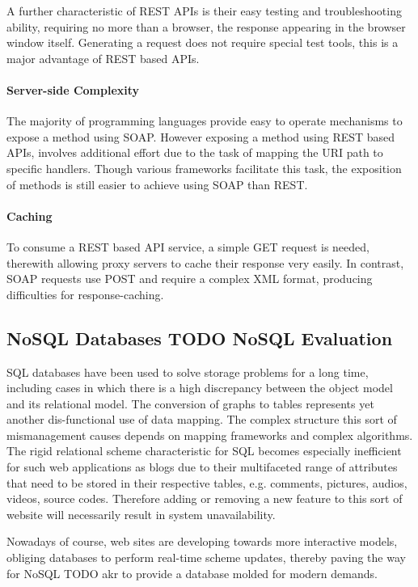 A further characteristic of REST APIs is their easy testing and troubleshooting ability, requiring no more than a browser, the response appearing in the browser window itself. Generating a request does not require special test tools, this is a major advantage of REST based APIs.  
  

\paragraph{Server-side Complexity}

The majority of programming languages provide easy to operate mechanisms to expose a method using SOAP. However exposing a method using REST based APIs, involves additional effort due to the task of mapping the URI path to specific handlers. Though various frameworks facilitate this task, the exposition of methods is still easier to achieve using SOAP than REST.

\paragraph{Caching}

To consume a REST based API service, a simple GET request is needed, therewith allowing proxy servers to cache their response very easily. In contrast, SOAP requests use POST and require a complex XML format, producing difficulties for response-caching.

\subsection{NoSQL Databases TODO NoSQL Evaluation\label{sec:back_da_per}}
SQL databases have been used to solve storage problems for a long time, including cases in which there is a high discrepancy between the object model and its relational model. The conversion of graphs to tables represents yet another dis-functional use of data mapping. The complex structure this sort of mismanagement causes depends on mapping frameworks and complex algorithms. The rigid relational scheme characteristic for SQL becomes especially inefficient for such web applications as blogs due to their multifaceted range of attributes that need to be stored in their respective tables, e.g. comments, pictures, audios, videos, source codes. Therefore adding or removing a new feature to this sort of website will necessarily result in system unavailability.          

Nowadays of course,  web sites are developing towards more interactive models, obliging databases to perform real-time scheme updates, thereby paving the way for NoSQL TODO akr to provide a database molded for modern demands. %

